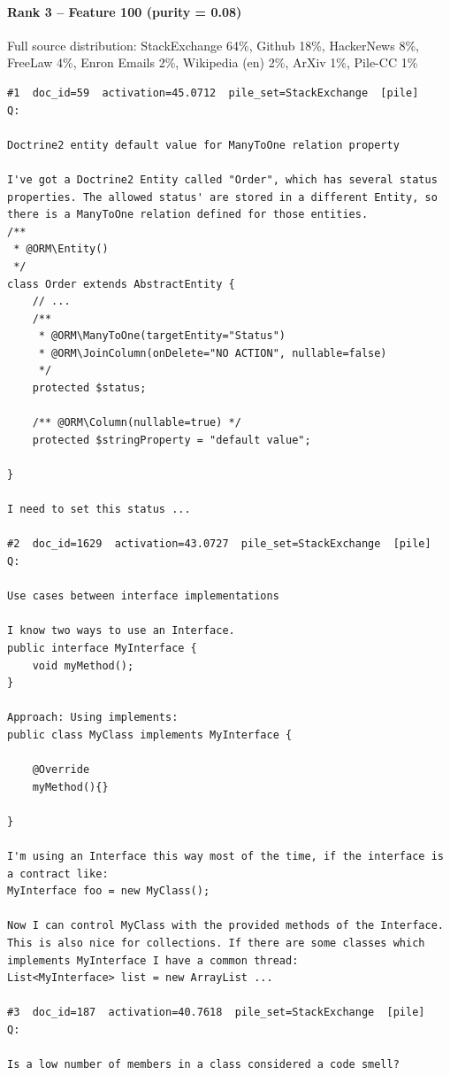 \paragraph*{Rank 3 -- Feature 100 (purity = 0.08)}

Full source distribution: StackExchange 64\%, Github 18\%, HackerNews 8\%, FreeLaw 4\%, Enron Emails 2\%, Wikipedia (en) 2\%, ArXiv 1\%, Pile-CC 1\%

\begin{verbatim}
#1  doc_id=59  activation=45.0712  pile_set=StackExchange  [pile]
Q:

Doctrine2 entity default value for ManyToOne relation property

I've got a Doctrine2 Entity called "Order", which has several status properties. The allowed status' are stored in a different Entity, so there is a ManyToOne relation defined for those entities.
/**
 * @ORM\Entity()
 */
class Order extends AbstractEntity {
    // ...
    /**
     * @ORM\ManyToOne(targetEntity="Status")
     * @ORM\JoinColumn(onDelete="NO ACTION", nullable=false)
     */
    protected $status;

    /** @ORM\Column(nullable=true) */
    protected $stringProperty = "default value";

}

I need to set this status ...

#2  doc_id=1629  activation=43.0727  pile_set=StackExchange  [pile]
Q:

Use cases between interface implementations

I know two ways to use an Interface. 
public interface MyInterface {
    void myMethod();
}

Approach: Using implements:
public class MyClass implements MyInterface {

    @Override
    myMethod(){}

}

I'm using an Interface this way most of the time, if the interface is a contract like:
MyInterface foo = new MyClass();   

Now I can control MyClass with the provided methods of the Interface.
This is also nice for collections. If there are some classes which implements MyInterface I have a common thread:  
List<MyInterface> list = new ArrayList ...

#3  doc_id=187  activation=40.7618  pile_set=StackExchange  [pile]
Q:

Is a low number of members in a class considered a code smell?


\end{verbatim}
